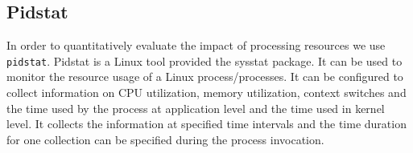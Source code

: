 \subsection{Pidstat}
In order to quantitatively evaluate the impact of processing resources we use \texttt{pidstat}.
Pidstat is a Linux tool provided the sysstat package.
It can be used to monitor the resource usage of a Linux process/processes.
It can be configured to collect information on CPU utilization, memory utilization, context switches and the time  used by the process at application level and the time used in kernel level.
It collects the information at specified time intervals and the time duration for one collection can be specified during the process invocation.

